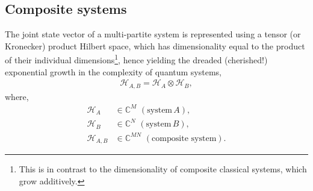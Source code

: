 %
%

\subsection{Composite systems}

The joint state vector of a multi-partite system is represented using a tensor (or Kronecker) product Hilbert space, which has dimensionality equal to the product of their individual dimensions\footnote{This is in contrast to the dimensionality of composite classical systems, which grow additively.}, hence yielding the dreaded (cherished!) exponential growth in the complexity of quantum systems,
\begin{align}
\mathcal{H}_{A,B} = \mathcal{H}_A\otimes \mathcal{H}_B,	
\end{align}
where,
\begin{align}
\mathcal{H}_A &\in\mathbb{C}^M\,\,(\mathrm{system}\,A),\nonumber\\
\mathcal{H}_B &\in\mathbb{C}^N\,\,(\mathrm{system}\,B),\nonumber\\
\mathcal{H}_{A,B} &\in\mathbb{C}^{MN}\,\,(\mathrm{composite\,\,system}).	
\end{align}

